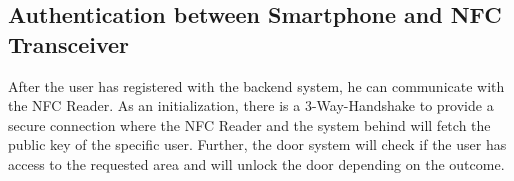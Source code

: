 \subsection{Authentication between Smartphone and NFC Transceiver}
After the user has registered with the backend system, he can communicate with the NFC Reader. As an initialization, there is a 3-Way-Handshake to provide a secure connection where the NFC Reader and the system behind will fetch the public key of the specific user. Further, the door system will check if the user has access to the requested area and will unlock the door depending on the outcome.

